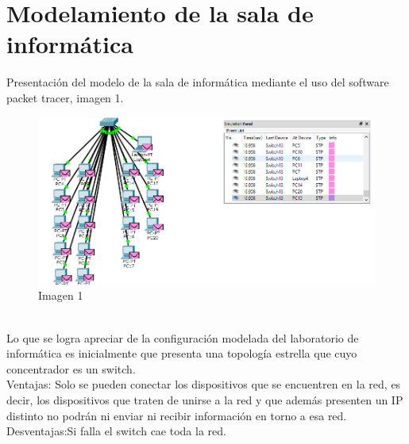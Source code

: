 \documentclass[spanish]{udpreport}
\begin{document}
\section{Modelamiento de la sala de informática}
Presentación del modelo de la sala de informática mediante el uso del software packet tracer, imagen 1.
\begin{figure}[h]
    \centering
    \includegraphics[scale=0.5]{images/inf111.png}
    \caption{Imagen 1}
    \label{fig:my_label}
\end{figure}
\\
Lo que se logra apreciar de la configuración modelada del laboratorio de informática es inicialmente que presenta una topología estrella que cuyo concentrador es un switch.
\\[0.2cm]
Ventajas: Solo se pueden conectar los dispositivos que se encuentren en la red, es decir, los dispositivos que  traten de unirse  a la red y  que además  presenten un IP distinto no podrán ni enviar ni recibir información en torno a esa red.
\\[0.2cm]
Desventajas:Si falla el switch cae toda la red.
\newpage
\end{document}
